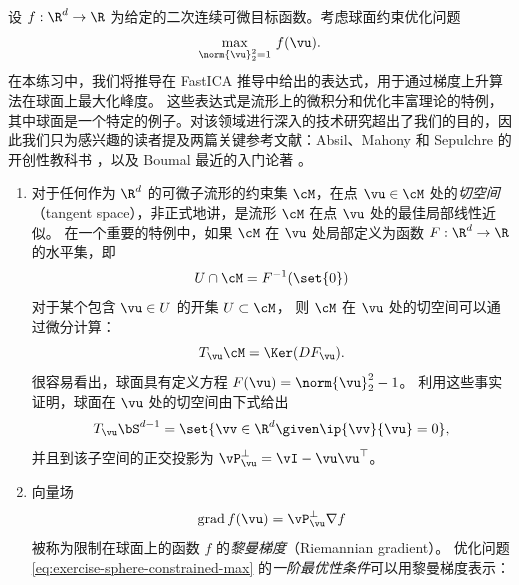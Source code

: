 \documentclass[../../book-main_zh.tex]{subfiles}
\begin{document}
\begin{exercise}\label{exercise:sphere-calculus}
    设 $f : \R^d \to \R$ 为给定的二次连续可微目标函数。考虑球面约束优化问题
    \begin{equation}\label{eq:exercise-sphere-constrained-max}
        \max_{\norm{\vu}_2^2 = 1}\, f(\vu).
    \end{equation}
    在本练习中，我们将推导在 FastICA 推导中给出的表达式，用于通过梯度上升算法在球面上最大化峰度。
    这些表达式是流形上的微积分和优化丰富理论的特例，其中球面是一个特定的例子。对该领域进行深入的技术研究超出了我们的目的，因此我们只为感兴趣的读者提及两篇关键参考文献：Absil、Mahony
    和 Sepulchre 的开创性教科书
    \cite{Absil2009-nc}，以及 Boumal 最近的入门论著
    \cite{Boumal2023-rj}。
    \begin{enumerate}
        \item 对于任何作为 $\R^d$ 的可微子流形的约束集 $\cM$，在点 $\vu \in \cM$
            处的\textit{切空间}（tangent space），非正式地讲，是流形 $\cM$ 在点 $\vu$ 处的最佳局部线性近似。
            在一个重要的特例中，如果 $\cM$ 在 $\vu$ 处局部定义为函数 $F : \R^d \to \R$ 的水平集，即
            \begin{equation*}
                U \cap \cM = F^{-1}(\set{0})
            \end{equation*}
            对于某个包含 $\vu \in U$ 的开集 $U \subset \cM$，
            则 $\cM$ 在 $\vu$ 处的切空间可以通过微分计算：
            \begin{equation*}
                T_{\vu} \cM = \Ker(DF_{\vu}).
            \end{equation*}
            很容易看出，球面具有定义方程 $F(\vu) = \norm{\vu}_2^2 - 1$。
            利用这些事实证明，球面在 $\vu$ 处的切空间由下式给出
            \begin{equation*}
                T_{\vu} \bS^{d-1} = \set{\vv \in \R^d \given \ip{\vv}{\vu} = 0},
            \end{equation*}
            并且到该子空间的正交投影为
            $\vP_{\vu}^\perp = \vI - \vu\vu^\top$。
        \item 向量场
            \begin{equation}\label{eq:exercise-riemann-grad-sphere}
                \mathrm{grad}\, f(\vu) = \vP_{\vu}^\perp \nabla f
            \end{equation}
            被称为限制在球面上的函数 $f$ 的\textit{黎曼梯度}（Riemannian gradient）。
            优化问题
            \eqref{eq:exercise-sphere-constrained-max}
            的\textit{一阶最优性条件}可以用黎曼梯度表示：

\end{enumerate}
\end{exercise}
\end{document}
